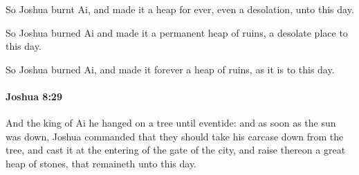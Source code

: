 			\begin{versebox}
					\item[BHS] 
					\item[ASV] So Joshua burnt Ai, and made it a heap for ever, even a desolation, unto this day.
					\item[NIV] So Joshua burned Ai and made it a permanent heap of ruins, a desolate place to this day.
					\item[NRSV] So Joshua burned Ai, and made it forever a heap of ruins, as it is to this day.
			\end{versebox}

		\paragraph{Joshua 8:29} %
			\label{JOSHUA-8-29}

			And the king of Ai he hanged on a tree until eventide: and as soon as the sun was down, Joshua commanded that they should take his carcase down from the tree, and cast it at the entering of the gate of the city, and raise thereon a great heap of stones, that remaineth unto this day.

